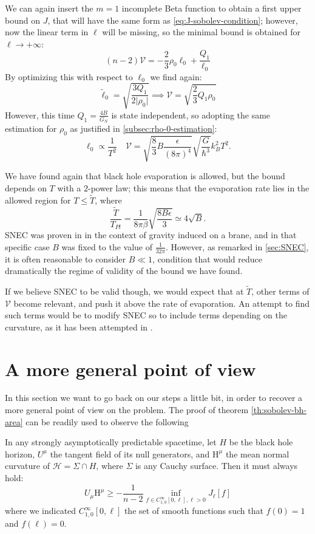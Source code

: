 We can again insert the \(m = 1\) incomplete Beta function to obtain a first upper bound on \(J\), that will have the same form as \ref{eq:J-sobolev-condition}; however, now the linear term in \(\ell\) will be missing, so the minimal bound is obtained for \(\ell\rightarrow +\infty\):
\[
	(n-2)\mathcal{V} = -\frac{2}{3}\rho_0\ell_0 + \frac{Q_1}{\ell_0}
\]
By optimizing this with respect to \(\ell_0\) we find again:
\[
	\tilde{\ell}_0 = \sqrt{\frac{3Q_1}{2\vert\rho_0\vert}} \implies \mathcal{V} = \sqrt{\frac{2}{3}Q_1\rho_0}
\]
However, this time \(Q_1 = \frac{4B}{G_N}\) is state independent, so adopting the same estimation for \(\rho_0\) as justified in \ref{subsec:rho-0-estimation}:
\[
\ell_0 \propto \frac{1}{T^2} \quad \mathcal{V} = \sqrt{\frac{8}{3}B \frac{\epsilon}{(8\pi)^4}} \sqrt{\frac{G}{\hbar^3}}k_B^2T^2.	
\] 

We have found again that black hole evaporation is allowed, but the bound depends on \(T\) with a \(2\)-power law; this means that the evaporation rate lies in the allowed region for \(T \le \tilde{T}\), where
\[
\frac{\tilde{T}}{T_{Pl}} = \frac{1}{8\pi\beta}\sqrt{\frac{8B\epsilon}{3}} \simeq 4\sqrt{B}.
\]
SNEC was proven in \cite{leichenauer2019upper} in the context of gravity induced on a brane, and in that specific case \(B\) was fixed to the value of \(\frac{1}{32\pi}\). However, as remarked in \ref{sec:SNEC}, it is often reasonable to consider \(B\ll 1\), condition that would reduce dramatically the regime of validity of the bound we have found. 

If we believe SNEC to be valid though, we would expect that at \(\tilde{T}\), other terms of \(\mathcal{V}\) become relevant, and push it above the rate of evaporation.
An attempt to find such terms would be to modify SNEC so to include terms depending on the curvature, as it has been attempted in \cite{kontou2015quantum}.

\section{A more general point of view}

In this section we want to go back on our steps a little bit, in order to recover a more general point of view on the problem. 
The proof of theorem \ref{th:sobolev-bh-area} can be readily used to observe the following
\begin{lemma}
	In any strongly asymptotically predictable spacetime, let \(H\) be the black hole horizon, \(U^{\mu}\) the tangent field of its null generators, and \(\mathrm{H}^{\mu}\) the mean normal curvature of \(\mathscr{H} = \Sigma \cap H\), where \(\Sigma\) is any Cauchy surface. Then it must always hold:
	\[
	U_{\mu}\mathrm{H}^{\mu} \ge -\frac{1}{n - 2} \inf_{f\in C^{\infty}_{1,0}[0, \ell], \ell > 0}J_{\ell}[f]
	\]
	where we indicated \(C^{\infty}_{1,0}[0, \ell]\) the set of smooth functions such that \(f(0) = 1\) and \(f(\ell) = 0\).
\end{lemma}

